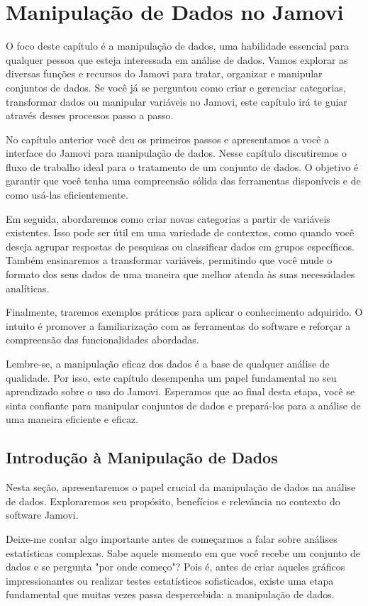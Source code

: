 \chapter{Manipulação de Dados no Jamovi}

O foco deste capítulo é a manipulação de dados, uma habilidade essencial para qualquer pessoa que esteja interessada em análise de dados. Vamos explorar as diversas funções e recursos do Jamovi para tratar, organizar e manipular conjuntos de dados. Se você já se perguntou como criar e gerenciar categorias, transformar dados ou manipular variáveis no Jamovi, este capítulo irá te guiar através desses processos passo a passo.

No capítulo anterior você deu os primeiros passos e apresentamos a você a interface do Jamovi para manipulação de dados. Nesse capítulo discutiremos o fluxo de trabalho ideal para o tratamento de um conjunto de dados. O objetivo é garantir que você tenha uma compreensão sólida das ferramentas disponíveis e de como usá-las eficientemente.

Em seguida, abordaremos como criar novas categorias a partir de variáveis existentes. Isso pode ser útil em uma variedade de contextos, como quando você deseja agrupar respostas de pesquisas ou classificar dados em grupos específicos. Também ensinaremos a transformar variáveis, permitindo que você mude o formato dos seus dados de uma maneira que melhor atenda às suas necessidades analíticas.

Finalmente, traremos exemplos práticos para aplicar o conhecimento adquirido. O intuito é promover a familiarização com as ferramentas do software e reforçar a compreensão das funcionalidades abordadas.

Lembre-se, a manipulação eficaz dos dados é a base de qualquer análise de qualidade. Por isso, este capítulo desempenha um papel fundamental no seu aprendizado sobre o uso do Jamovi. Esperamos que ao final desta etapa, você se sinta confiante para manipular conjuntos de dados e prepará-los para a análise de uma maneira eficiente e eficaz.

\section{Introdução à Manipulação de Dados}
Nesta seção, apresentaremos o papel crucial da manipulação de dados na análise de dados. Exploraremos seu propósito, benefícios e relevância no contexto do software Jamovi.

Deixe-me contar algo importante antes de começarmos a falar sobre análises estatísticas complexas. Sabe aquele momento em que você recebe um conjunto de dados e se pergunta "por onde começo"? Pois é, antes de criar aqueles gráficos impressionantes ou realizar testes estatísticos sofisticados, existe uma etapa fundamental que muitas vezes passa despercebida: a manipulação de dados.

